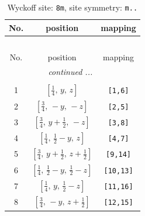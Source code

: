 \documentclass[fleqn,8pt]{jsarticle}
\begin{document}
\begin{longtable}{ccc}
\caption{Wyckoff site: {\tt 8m}, site symmetry: {\tt m..}}
 \\
 \hline \hline
No. & position & mapping \\ \hline \endfirsthead

\multicolumn{2}{l}{\tablename\ \thetable{}} \\
 \hline \hline
No. & position & mapping \\ \hline \endhead

 \hline \hline
\multicolumn{2}{r}{\footnotesize\it continued ...} \\ \endfoot

 \hline \hline
\multicolumn{2}{r}{} \\ \endlastfoot

1 & $\left[ \frac{1}{4},\, y,\, z \right]$ & {\tt [1,6]} \\ \hline
2 & $\left[ \frac{3}{4},\, - y,\, - z \right]$ & {\tt [2,5]} \\ \hline
3 & $\left[ \frac{3}{4},\, y + \frac{1}{2},\, - z \right]$ & {\tt [3,8]} \\ \hline
4 & $\left[ \frac{1}{4},\, \frac{1}{2} - y,\, z \right]$ & {\tt [4,7]} \\ \hline
5 & $\left[ \frac{3}{4},\, y + \frac{1}{2},\, z + \frac{1}{2} \right]$ & {\tt [9,14]} \\ \hline
6 & $\left[ \frac{1}{4},\, \frac{1}{2} - y,\, \frac{1}{2} - z \right]$ & {\tt [10,13]} \\ \hline
7 & $\left[ \frac{1}{4},\, y,\, \frac{1}{2} - z \right]$ & {\tt [11,16]} \\ \hline
8 & $\left[ \frac{3}{4},\, - y,\, z + \frac{1}{2} \right]$ & {\tt [12,15]} \\
\end{longtable}
\renewcommand{\arraystretch}{1.2}
\end{document}
